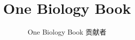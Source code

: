 \documentclass[11pt,a4paper,twoside,openany]{book}
\title{One Biology Book}
\author{One Biology Book 贡献者}
\date{\bookdate}
\begin{document}
\frontmatter




\tableofcontents

\mainmatter





\appendix
\part{\omsolutionspart}




\backmatter
\renewcommand{\indexspace}{\par\vskip 6pt plus 3pt minus 6pt\relax}
\printindex
\end{document}

